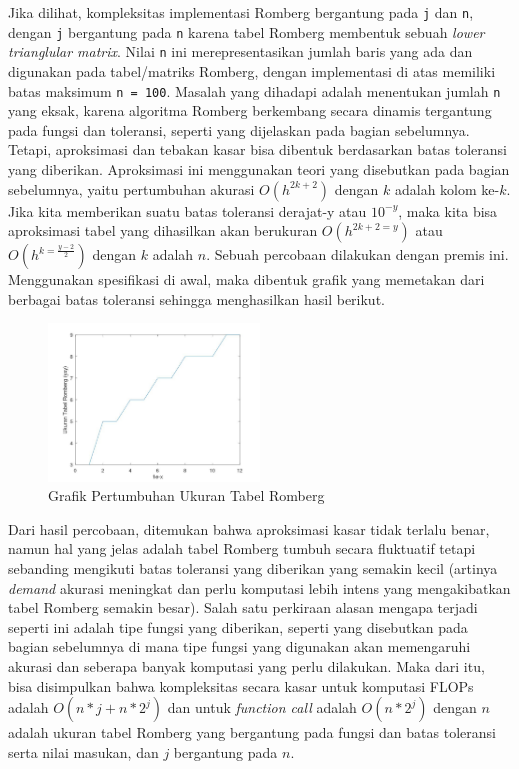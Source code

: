 \documentclass[journal,12pt,onecolumn,a4paper]{IEEEtran}
\begin{document}
Jika dilihat, kompleksitas implementasi Romberg bergantung pada \lstinline{j} dan \lstinline{n}, dengan \lstinline{j} bergantung pada \lstinline{n} karena tabel Romberg membentuk sebuah \emph{lower trianglular matrix}. Nilai \lstinline{n} ini merepresentasikan jumlah baris yang ada dan digunakan pada tabel/matriks Romberg, dengan implementasi di atas memiliki batas maksimum \lstinline{n = 100}.
Masalah yang dihadapi adalah menentukan jumlah \lstinline{n} yang eksak, karena algoritma Romberg berkembang secara dinamis tergantung pada fungsi dan toleransi, seperti yang dijelaskan pada bagian sebelumnya. Tetapi, aproksimasi dan tebakan kasar bisa dibentuk berdasarkan batas toleransi yang diberikan. Aproksimasi ini menggunakan teori yang disebutkan pada bagian sebelumnya, yaitu pertumbuhan akurasi \(O(h^{2k+2})\) dengan \(k\) adalah kolom ke-\(k\).
Jika kita memberikan suatu batas toleransi derajat-y atau \(10^{-y}\), maka kita bisa aproksimasi tabel yang dihasilkan akan berukuran \(O(h^{2k+2 = y})\) atau \(O(h^{k=\frac{y-2}{2}})\) dengan \(k\) adalah \(n\).
Sebuah percobaan dilakukan dengan premis ini. Menggunakan spesifikasi di awal, maka dibentuk grafik yang memetakan dari berbagai batas toleransi sehingga menghasilkan hasil berikut.

\begin{figure}[h]
	\centering
	\includegraphics[width=0.5\textwidth]{rombergSize}
	\caption{Grafik Pertumbuhan Ukuran Tabel Romberg}
	\label{fig:rombergTableGraph}
\end{figure}

Dari hasil percobaan, ditemukan bahwa aproksimasi kasar tidak terlalu benar, namun hal yang jelas adalah tabel Romberg tumbuh secara fluktuatif tetapi sebanding mengikuti batas toleransi yang diberikan yang semakin kecil (artinya \emph{demand} akurasi meningkat dan perlu komputasi lebih intens yang mengakibatkan tabel Romberg semakin besar).
Salah satu perkiraan alasan mengapa terjadi seperti ini adalah tipe fungsi yang diberikan, seperti yang disebutkan pada bagian sebelumnya di mana tipe fungsi yang digunakan akan memengaruhi akurasi dan seberapa banyak komputasi yang perlu dilakukan.
Maka dari itu, bisa disimpulkan bahwa kompleksitas secara kasar untuk komputasi FLOPs adalah \(O(n*j + n*2^j)\) dan untuk \emph{function call} adalah \(O(n*2^j)\) dengan \(n\) adalah ukuran tabel Romberg yang bergantung pada fungsi dan batas toleransi serta nilai masukan, dan \(j\) bergantung pada \(n\).
\end{document}
